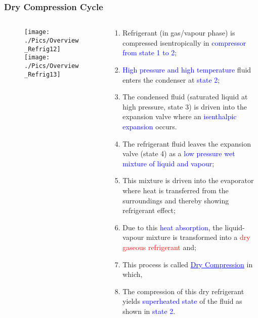 \documentclass[10pt,compress,handout,unknownkeysallowed]{beamer}
\begin{document}
\begin{frame}
 \frametitle{Dry Compression Cycle} 
  \begin{columns}
   \begin{column}[c]{0.5\linewidth}
    \begin{figure}%
     \vbox{
      \texttt{[image: ./Pics/Overview\_Refrig12]}
      \vspace{-.5cm}
      \texttt{[image: ./Pics/Overview\_Refrig13]}}
    \end{figure}  
   \end{column}  
   \begin{column}[c]{0.5\linewidth}
  \begin{enumerate}[(1)] \scriptsize
   \item <1-> Refrigerant (in gas/vapour phase) is compressed isentropically in \textcolor{blue}{compressor from state 1 to 2}; 
   \item <1-> \textcolor{blue}{High pressure and high temperature} fluid enters the condenser at \textcolor{blue}{state 2};
   \item <1-> The condensed fluid (saturated liquid at high pressure, state 3) is driven into the expansion valve where an \textcolor{blue}{isenthalpic expansion} occurs.
   \item <1-> The refrigerant fluid leaves the expansion valve (state 4) as a \textcolor{blue}{low pressure wet mixture of liquid and vapour};
   \item <2-> This mixture is driven into the evaporator where heat is transferred from the surroundings and thereby showing refrigerant effect; 
   \item <2-> Due to this \textcolor{blue}{heat absorption}, the liquid-vapour mixture is transformed into a \textcolor{red}{dry gaseous refrigerant} and;
   \item <3-> This process is called \textcolor{blue}{\underline{Dry Compression}} in which,
   \item <3-> The compression of this dry refrigerant yields \textcolor{blue}{superheated state} of the fluid as shown in \textcolor{blue}{state 2}.
  \end{enumerate}
 \end{column}  
\end{columns}
\end{frame}
\end{document}
